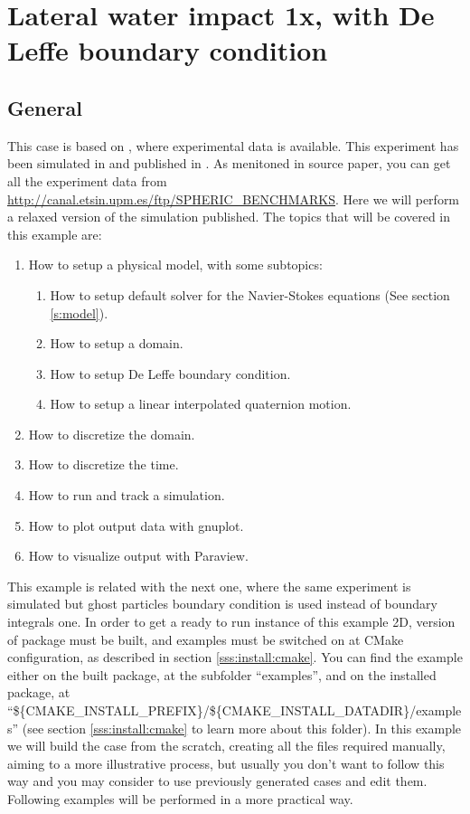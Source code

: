 \section{Lateral water impact 1x, with De Leffe boundary condition}
\label{ss:example:lateral_water_1x_deleffe}
%
\subsection{General}
%
This case is based on \citet{botia_etal_spheric10}, where experimental data is available. This experiment has
been simulated in \NAME and published in \citet{Maciaetal_PTP_2012}. As menitoned in source paper, you can get
all the experiment data from \url{http://canal.etsin.upm.es/ftp/SPHERIC\_BENCHMARKS}. Here we will perform a
relaxed version of the simulation published.
%
The topics that will be covered in this example are:
%
\begin{enumerate}
	\item How to setup a physical model, with some subtopics:
	\begin{enumerate}
		\item How to setup default \NAME solver for the Navier-Stokes equations (See section \ref{s:model}).
		\item How to setup a domain.
		\item How to setup De Leffe boundary condition.
		\item How to setup a linear interpolated quaternion motion.
	\end{enumerate}
	\item How to discretize the domain.
	\item How to discretize the time.
	\item How to run and track a simulation.
	\item How to plot output data with gnuplot.
	\item How to visualize output with Paraview.
\end{enumerate}
%
This example is related with the next one, where the same experiment is simulated but ghost particles boundary
condition is used instead of boundary integrals one.\rc
%
In order to get a ready to run instance of this example 2D, version of \NAME package must be built, and examples
must be switched on at CMake configuration, as described in section \ref{sss:install:cmake}. You can find the
example either on the built package, at the subfolder ``examples'', and on the installed package, at\\
``\$\{CMAKE\_INSTALL\_PREFIX\}/\$\{CMAKE\_INSTALL\_DATADIR\}/examples'' (see section \ref{sss:install:cmake} to
learn more about this folder).\rc
%
In this example we will build the case from the scratch, creating all the files required manually, aiming to
a more illustrative process, but usually you don't want to follow this way and you may consider to use
previously generated cases and edit them. Following examples will be performed in a more practical way.
%
